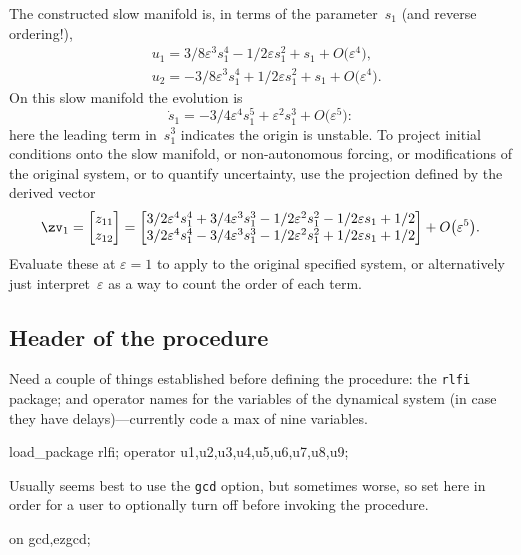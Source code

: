 \documentclass[11pt,a5paper]{article}
\def\eps{\varepsilon}
\begin{document}
The constructed slow manifold is, in terms of the
parameter~\(s_1\) (and reverse ordering!), 
\begin{align*}&
u_{1}=3/8 \eps^{3} s_{1}^{4}-1/2 \eps s_{1}^{2}+s_{1}
+O\big(\varepsilon ^{4}\big),
\\&
u_{2}=-3/8 \eps^{3} s_{1}^{4}+1/2 \eps s_{1}^{2}+s_{1}
+O\big(\varepsilon ^{4}\big).
\end{align*}
On this slow manifold the evolution is
\begin{equation*}
\dot s_{1}=-3/4 \eps^{4} s_{1}^{5}+\eps^{2} s_{1}^{3}
+O\big(\varepsilon ^{5}\big):
\end{equation*}
here the leading term in~\(s_1^3\) indicates the origin is
unstable. To project initial conditions onto the slow
manifold, or non-autonomous forcing, or modifications of the
original system, or to quantify uncertainty, use the
projection defined by the derived vector
\begin{equation*}
\zv_1=\begin{bmatrix}z_{11}\\z_{12}\end{bmatrix}
=\begin{bmatrix}
3/2 \eps^{4} s_{1}^{4}+3/4 \eps^{3} s_{1}^{3}-1/2 \eps^{2} s_{1}
^{2}-1/2 \eps s_{1}+1/2
\\
3/2 \eps^{4} s_{1}^{4}-3/4 \eps^{3} s_{1}^{3}-1/2 \eps^{2} s_{1}
^{2}+1/2 \eps s_{1}+1/2
\end{bmatrix}+O\big(\varepsilon ^{5}\big).
\end{equation*}
Evaluate these at \(\eps=1\) to apply to the original
specified system, or alternatively just interpret~\(\eps\) 
as a way to count the order of each term.




\subsection{Header of the procedure}

Need a couple of things established before defining the
procedure: the \verb|rlfi| package; and operator names for
the variables of the dynamical system (in case they have
delays)---currently code a max of nine variables.
\begin{reduce}
load_package rlfi; 
operator u1,u2,u3,u4,u5,u6,u7,u8,u9;
\end{reduce}
Usually seems best to use the \verb|gcd| option, but sometimes worse, so set here in order for a user to optionally turn off before invoking the procedure.
\begin{reduce}
on gcd,ezgcd; 
\end{reduce}
\end{document}
